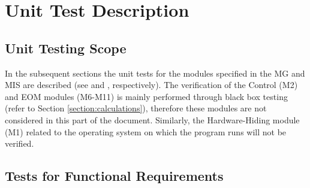 \documentclass[12pt, titlepage]{article}
\begin{document}
\section{Unit Test Description}
\label{section:unittest}


\subsection{Unit Testing Scope}
\label{sec:unitscope}


In the subsequent sections the unit tests for the modules specified in the MG 
and MIS are described (see \cite{MG2020} and \cite{MIS2020}, respectively). The 
verification of the Control (M2) and EOM modules (M6-M11) is mainly performed 
through black box testing (refer to Section \ref{section:calculations}), 
therefore these modules are not considered in this part of the document. 
Similarly, the Hardware-Hiding module (M1) related to the operating system on 
which the program runs will not be verified.

\subsection{Tests for Functional Requirements}

\end{document}
